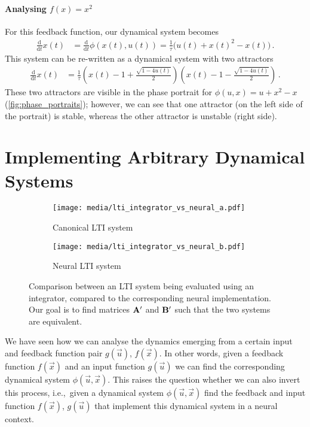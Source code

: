\documentclass[10pt,letterpaper,oneside]{article}
\begin{document}
\paragraph{Analysing $f(x) = x^2$}
For this feedback function, our dynamical system becomes
\begin{align*}
	\frac{\mathrm{d}}{\mathrm{d}t} x(t) &= \frac{\mathrm{d}}{\mathrm{d}t} \phi(x(t), u(t)) = \frac{1}{\tau} \big(u(t) + x(t)^2 - x(t) \big) \,.	
\end{align*}
This system can be re-written as a dynamical system with two attractors
\begin{align*}
	\frac{\mathrm{d}}{\mathrm{d}t} x(t) &=\frac{1}{\tau} \left( x(t) - 1 + \frac{\sqrt{1 - 4u(t)}}{2} \right) \left( x(t) - 1 - \frac{\sqrt{1 - 4u(t)}}{2} \right) \,.
\end{align*}
These two attractors are visible in the phase portrait for $\phi(u, x) = u + x^2 - x$ (\cref{fig:phase_portraits}); however, we can see that one attractor (on the left side of the portrait) is stable, whereas the other attractor is unstable (right side).

\section{Implementing Arbitrary Dynamical Systems}

\begin{figure}
	\centering%
	\begin{subfigure}{0.5\textwidth}%
		\centering%
		\texttt{[image: media/lti\_integrator\_vs\_neural\_a.pdf]}%
		\caption{Canonical LTI system}%
		\label{fig:lti_integrator_vs_neural_a}%
	\end{subfigure}%
	\begin{subfigure}{0.5\textwidth}%
		\centering%
		\texttt{[image: media/lti\_integrator\_vs\_neural\_b.pdf]}%
		\caption{Neural LTI system}%
		\label{fig:lti_integrator_vs_neural_b}%
	\end{subfigure}
	\caption{Comparison between an LTI system being evaluated using an integrator, compared to the corresponding neural implementation. Our goal is to find matrices ${\mathbf{A}}'$ and ${\mathbf{B}}'$ such that the two systems are equivalent.}
\end{figure}

We have seen how we can analyse the dynamics emerging from a certain input and feedback function pair $g(\vec u)$, $f(\vec x)$. In other words, given a feedback function $f(\vec x)$ and an input function $g(\vec u)$ we can find the corresponding dynamical system $\phi(\vec u, \vec x)$. This raises the question whether we can also invert this process, i.e.,~given a dynamical system $\phi(\vec u, \vec x)$ find the feedback and input function $f(\vec x)$, $g(\vec u)$ that implement this dynamical system in a neural context.
\end{document}
